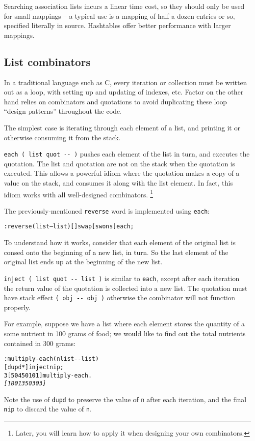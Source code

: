 \documentclass[english]{article}
\begin{document}
Searching association lists incurs a linear time cost, so they should
only be used for small mappings -- a typical use is a mapping of half
a dozen entries or so, specified literally in source. Hashtables offer
better performance with larger mappings.


\subsection{List combinators}

In a traditional language such as C, every iteration or collection
must be written out as a loop, with setting up and updating of indexes,
etc. Factor on the other hand relies on combinators and quotations
to avoid duplicating these loop ``design patterns'' throughout
the code.

The simplest case is iterating through each element of a list, and
printing it or otherwise consuming it from the stack.

\texttt{each ( list quot -{}- )} pushes each element of the list in
turn, and executes the quotation. The list and quotation are not on
the stack when the quotation is executed. This allows a powerful idiom
where the quotation makes a copy of a value on the stack, and consumes
it along with the list element. In fact, this idiom works with all
well-designed combinators.%
\footnote{Later, you will learn how to apply it when designing your own combinators.%
}

The previously-mentioned \texttt{reverse} word is implemented using
\texttt{each}:
\begin{alltt}
: reverse ( list -- list ) {[} {]} swap {[} swons {]} each ;
\end{alltt}
To understand how it works, consider that each element of the original
list is consed onto the beginning of a new list, in turn. So the last
element of the original list ends up at the beginning of the new list.

\texttt{inject ( list quot -{}- list )} is similar to \texttt{each},
except after each iteration the return value of the quotation is collected into a new
list. The quotation must have stack effect
\texttt{( obj -{}- obj )} otherwise the combinator
will not function properly.

For example, suppose we have a list where each element stores the
quantity of a some nutrient in 100 grams of food; we would like to
find out the total nutrients contained in 300 grams:

\begin{alltt}
: multiply-each ( n list -{}- list )
    {[} dupd {*} {]} inject nip ;
3 {[} 50 450 101 {]} multiply-each .
\emph{{[} 180 1350 303 {]}}
\end{alltt}
Note the use of \texttt{dupd} to preserve the value of \texttt{n} after each iteration, and the final \texttt{nip} to discard the value of \texttt{n}.
\end{document}
